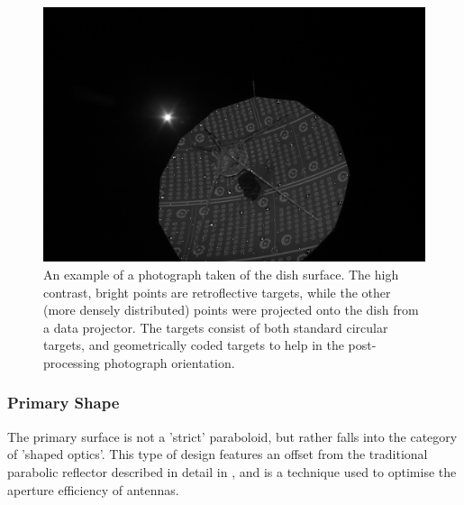 \begin{figure}[ht]
 \centering
 \includegraphics[width=\textwidth]{./images/photogrammetry/PhotoExamples/projectedAndRetrofelctive.JPG}
 \caption{An example of a photograph taken of the dish surface. The high contrast, bright points are retroflective targets, while the other (more densely distributed) points were projected onto the dish from a data projector. The targets consist of both standard circular targets, and geometrically coded targets to help in the post-processing photograph orientation.}
 \label{fig:photogrammetryExampleOfPhotograph}
\end{figure}

\subsubsection{Primary Shape}
The primary surface is not a 'strict' paraboloid, but rather falls into the category of 'shaped optics'. This type of design features an offset from the traditional parabolic reflector described in detail in , and is a technique used to optimise the aperture efficiency of antennas.

